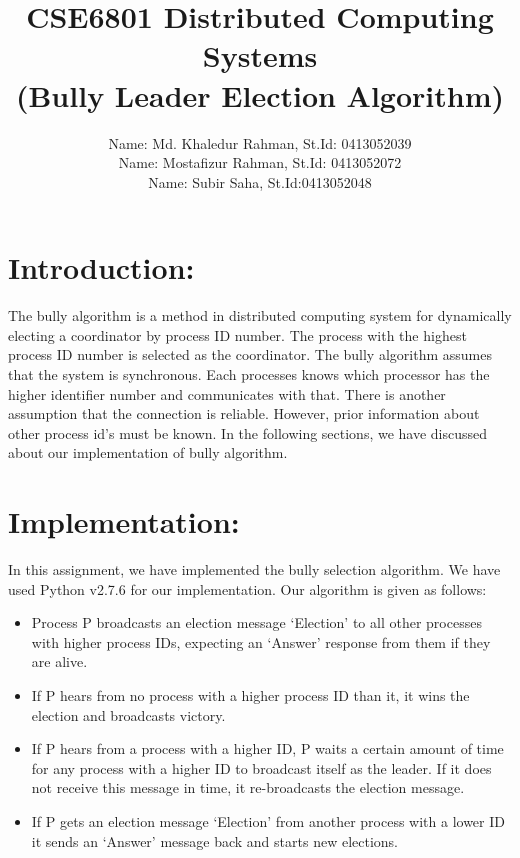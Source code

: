 \documentclass{article}
\begin{document}
\title{CSE6801 Distributed Computing Systems\\
(Bully Leader Election Algorithm)}
\author{Name: Md. Khaledur Rahman, St.Id: 0413052039\\ Name: Mostafizur Rahman, St.Id: 0413052072\\Name: Subir Saha, St.Id:0413052048}
\maketitle

\section*{Introduction:}
The bully algorithm is a method in distributed computing system for dynamically electing a coordinator by process ID number. The process with the highest process ID number is selected as the coordinator. The bully algorithm assumes that the system is synchronous. Each processes knows which processor has the higher identifier number and communicates with that. There is another assumption that the connection is reliable. However, prior information about other process id's must be known. In the following sections, we have discussed about our implementation of bully algorithm.

\section*{Implementation:}

In this assignment, we have implemented the bully selection algorithm. We have used Python v2.7.6 for our implementation. Our algorithm is given as follows:

\begin{itemize}
\item Process P broadcasts an election message `Election' to all other processes with higher process IDs, expecting an `Answer' response from them if they are alive.
\item If P hears from no process with a higher process ID than it, it wins the election and broadcasts victory.
\item If P hears from a process with a higher ID, P waits a certain amount of time for any process with a higher ID to broadcast itself as the leader. If it does not receive this message in time, it re-broadcasts the election message.
\item If P gets an election message `Election' from another process with a lower ID it sends an `Answer' message back and starts new elections.
\end{itemize}
\end{document}
